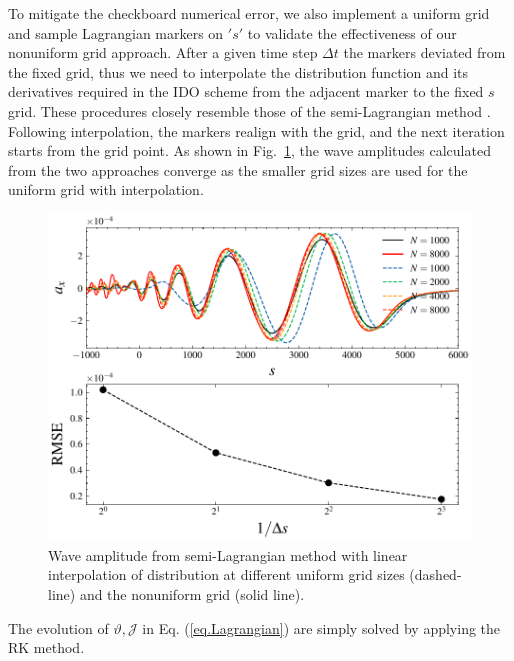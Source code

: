 To mitigate the checkboard numerical error, we also implement a uniform grid and sample Lagrangian markers on $'s'$ to validate the effectiveness of our nonuniform grid approach.
After a given time step $\Delta t$ the markers deviated from the fixed grid, thus  we need to interpolate the distribution function and its derivatives required in the IDO scheme from the adjacent marker to the fixed $s$ grid.
These procedures closely resemble those of the semi-Lagrangian method \cite{sonnendrucker1999,cottet2018}. Following interpolation, the markers realign with the grid, and the next iteration starts from the grid point.
As shown in Fig.~\ref{fig.cmp1}, the wave amplitudes calculated from  the two approaches converge  as the smaller grid sizes are used for the uniform grid with interpolation.  
\begin{figure}[htbp]
    \centering
    \includegraphics[scale=0.5]{cpc_img/fig_semiL.pdf}
    \caption{Wave amplitude from semi-Lagrangian method with linear interpolation of distribution at different uniform grid sizes (dashed-line) and the nonuniform grid (solid line).
    }
    \label{fig.cmp1}
\end{figure}
The evolution of $\vartheta,\mathcal{J}$ in Eq. (\ref{eq.Lagrangian}) are simply solved by applying the RK method.


